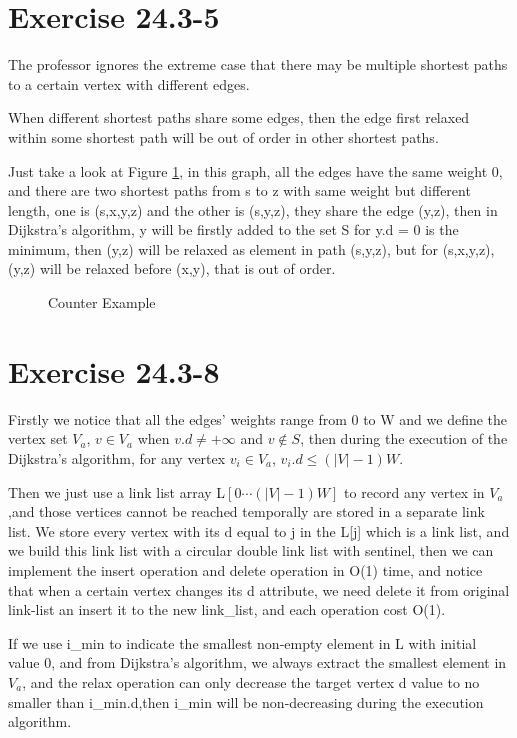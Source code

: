 \documentclass[oneside]{homework} %
\begin{document}
\maketitle
\newpage
\section{Exercise 24.3-5}
The professor ignores the extreme case that there may be multiple shortest paths to a certain vertex with different edges. 

When different shortest paths share some edges, then the edge first relaxed within some shortest path will be out of order in other shortest paths. 

Just take a look at Figure \ref{fig:ce1}, in this graph, all the edges have the same weight 0, and there are two shortest paths from s to z with same weight but different length, one is (s,x,y,z) and the other is (s,y,z), they share the edge (y,z), then in Dijkstra's algorithm, y will be firstly added to the set S for y.d = 0 is the minimum, then (y,z) will be relaxed as element in path (s,y,z), but for (s,x,y,z), (y,z) will be relaxed before (x,y), that is out of order.
\begin{figure}[!h]
  \centering
  \caption{Counter Example}
  \label{fig:ce1}
\end{figure}

\section{Exercise 24.3-8}
Firstly we notice that all the edges' weights range from 0 to W and we define the vertex set $V_{a}$, $v \in V_{a}$ when $v.d \neq +\infty$ and $ v \notin S $, then during the execution of the Dijkstra's algorithm, for any vertex $v_{i} \in V_{a}$, $v_{i}.d \leq (|V|-1)W$.

Then we just use a link list array L$[0 \cdots (|V|-1)W]$ to record any vertex in $V_{a}$,and those vertices cannot be reached temporally are stored in a separate link list. We store every vertex with its d equal to j in the L[j] which is a link list, and we build this link list with a circular double link list with sentinel, then we can implement the insert operation and delete operation in O(1) time, and notice that when a certain vertex changes its d attribute, we need delete it from original link-list an insert it to the new link\_list, and each operation cost O(1).

If we use i\_min to indicate the smallest non-empty element in L with initial value 0, and from Dijkstra's algorithm, we always extract the smallest element in $V_{a}$, and the relax operation can only decrease the target vertex d value to no smaller than i\_min.d,then i\_min will be non-decreasing during the execution algorithm.
\end{document}
